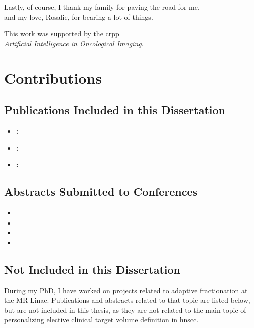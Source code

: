 \documentclass[\relativeRoot/main.tex]{subfiles}
\begin{document}
Lastly, of course, I thank my family for paving the road for me,\\and my love, Rosalie, for bearing a lot of things.

\vspace{4cm}

This work was supported by the \gls{crpp}\\\href{https://www.crpp-ai-oncology.uzh.ch/en.html}{\emph{Artificial Intelligence in Oncological Imaging}}.

\chapter*{Contributions}
\section*{Publications Included in this Dissertation}
\begin{itemize}
    \item \textbf{:} 
    \item \textbf{:} 
    \item \textbf{:} 
\end{itemize}

\section*{Abstracts Submitted to Conferences}
\begin{itemize}
    \item {}
    \item {}
    \item {}
    \item {}
\end{itemize}

\section*{Not Included in this Dissertation}

During my PhD, I have worked on projects related to adaptive fractionation at the MR-Linac. Publications and abstracts related to that topic are listed below, but are not included in this thesis, as they are not related to the main topic of personalizing elective clinical target volume definition in \gls{hnscc}.
\end{document}
